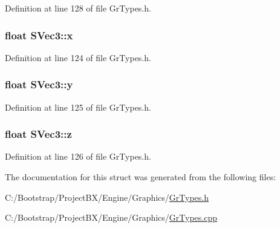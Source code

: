 Definition at line 128 of file GrTypes.h.\hypertarget{struct_s_vec3_a30ab4ca24f2b7968f6b21a97c28a812}{
\subsubsection[{x}]{\setlength{\rightskip}{0pt plus 5cm}float {\bf SVec3::x}}}
\label{struct_s_vec3_a30ab4ca24f2b7968f6b21a97c28a812}




Definition at line 124 of file GrTypes.h.\hypertarget{struct_s_vec3_9e4d6ddc68169c650b437a7d1714f299}{
\subsubsection[{y}]{\setlength{\rightskip}{0pt plus 5cm}float {\bf SVec3::y}}}
\label{struct_s_vec3_9e4d6ddc68169c650b437a7d1714f299}




Definition at line 125 of file GrTypes.h.\hypertarget{struct_s_vec3_d9d349dd9369afd5bd7d056e59b3ae4a}{
\subsubsection[{z}]{\setlength{\rightskip}{0pt plus 5cm}float {\bf SVec3::z}}}
\label{struct_s_vec3_d9d349dd9369afd5bd7d056e59b3ae4a}




Definition at line 126 of file GrTypes.h.

The documentation for this struct was generated from the following files:\begin{CompactItemize}
\item 
C:/Bootstrap/ProjectBX/Engine/Graphics/\hyperlink{_gr_types_8h}{GrTypes.h}\item 
C:/Bootstrap/ProjectBX/Engine/Graphics/\hyperlink{_gr_types_8cpp}{GrTypes.cpp}\end{CompactItemize}
